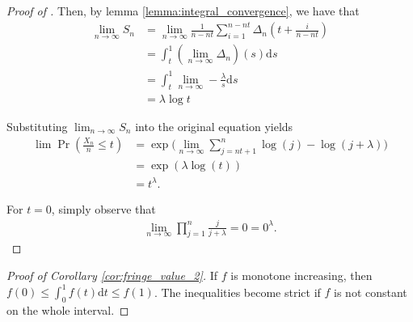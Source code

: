 \documentclass[a4paper]{article}
\newcommand{\dt}{\mathrm{d}t}
\newcommand{\ds}{\mathrm{d}s}
\begin{document}
\begin{proof}[Proof of ]
    Then, by lemma \ref{lemma:integral_convergence}, we have that
    \begin{align*}
        \lim_{n \to \infty} S_n &= \lim_{n \to \infty} \frac{1}{n-nt} \sum_{i=1}^{n-nt} \Delta_n \left( t + \frac{i}{n - nt} \right) \\
        &= \int_t^1 (\lim_{n \to \infty} \Delta_n)(s) \ds \\
        &= \int_t^1 \lim_{n \to \infty} -\frac{\lambda}{s} \ds \\
        &= \lambda \log{t}
    \end{align*}

    Substituting $\lim_{n \to \infty} S_n$ into the original equation yields
    \begin{align*}
        \lim \Pr \left( \frac{X_n}{n} \leq t \right) &= \exp \Bigg( \lim_{n \to \infty} \sum_{j = nt + 1}^n \log(j) - \log(j+\lambda) \Bigg) \\
        &= \exp(\lambda \log(t)) \\
        &= t^\lambda.
    \end{align*}

    For $t=0$, simply observe that %
    \begin{align*}
        \lim_{n \to \infty} \prod_{j = 1}^n \frac{j}{j + \lambda} = 0 = 0^\lambda.
    \end{align*}
\end{proof}

\begin{proof}[Proof of Corollary \ref{cor:fringe_value_2}]
    If $f$ is monotone increasing, then $f(0) \leq \int_0^1 f(t) \dt \leq f(1)$.
    The inequalities become strict if $f$ is not constant on the whole interval.
\end{proof}
\end{document}
